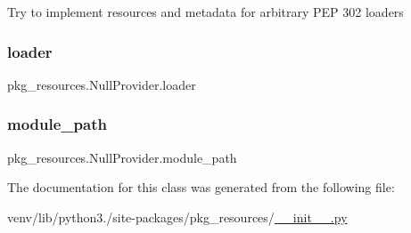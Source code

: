 \begin{DoxyVerb}Try to implement resources and metadata for arbitrary PEP 302 loaders\end{DoxyVerb}
 \mbox{\label{classpkg__resources_1_1NullProvider_a824227ff9d57076b31e81215e482615e}} 
\subsubsection{\texorpdfstring{loader}{loader}}
{\footnotesize\ttfamily pkg\+\_\+resources.\+Null\+Provider.\+loader\hspace{0.3cm}{\ttfamily [static]}}

\mbox{\label{classpkg__resources_1_1NullProvider_a90c7b6ef27446c70d03cb2b634b31e97}} 
\subsubsection{\texorpdfstring{module\+\_\+path}{module\_path}}
{\footnotesize\ttfamily pkg\+\_\+resources.\+Null\+Provider.\+module\+\_\+path}



The documentation for this class was generated from the following file\+:\begin{DoxyCompactItemize}
\item 
venv/lib/python3./site-\/packages/pkg\+\_\+resources/\hyperlink{venv_2lib_2python3_89_2site-packages_2pkg__resources_2____init_____8py}{\+\_\+\+\_\+init\+\_\+\+\_\+.\+py}\end{DoxyCompactItemize}
